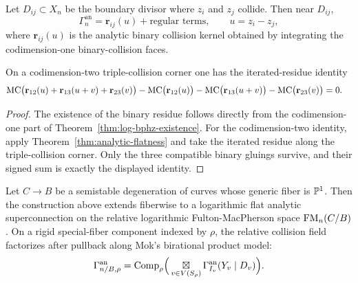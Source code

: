 \begin{theorem}\label{thm:analytic-yb}
Let $D_{ij}\subset X_n$ be the boundary divisor where $z_i$ and $z_j$ collide. Then near $D_{ij}$,
\[
 \Gamma_n^{\mathrm{an}} = \mathbf r_{ij}(u)+\text{regular terms},
 \qquad u=z_i-z_j,
\]
where $\mathbf r_{ij}(u)$ is the analytic binary collision kernel obtained by integrating the codimension-one binary-collision faces.

On a codimension-two triple-collision corner one has the iterated-residue identity
\begin{align*}
 &\mathrm{MC}\big(\mathbf r_{12}(u)+\mathbf r_{13}(u+v)+\mathbf r_{23}(v)\big)
 -\mathrm{MC}\big(\mathbf r_{12}(u)\big)
 -\mathrm{MC}\big(\mathbf r_{13}(u+v)\big)
 -\mathrm{MC}\big(\mathbf r_{23}(v)\big)
 =0.
\end{align*}
\end{theorem}

\begin{proof}
The existence of the binary residue follows directly from the codimension-one part of Theorem~\ref{thm:log-bphz-existence}. For the codimension-two identity, apply Theorem~\ref{thm:analytic-flatness} and take the iterated residue along the triple-collision corner. Only the three compatible binary gluings survive, and their signed sum is exactly the displayed identity.
\end{proof}

\begin{theorem}\label{thm:family-version}
Let $C\to B$ be a semistable degeneration of curves whose generic fiber is $\mathbb P^1$. Then the construction above extends fiberwise to a logarithmic flat analytic superconnection on the relative logarithmic Fulton-MacPherson space $\mathrm{FM}_n(C/B)$. On a rigid special-fiber component indexed by $\rho$, the relative collision field factorizes after pullback along Mok's birational product model:
\[
 \Gamma_{n/B,\rho}^{\mathrm{an}}
 =
 \mathrm{Comp}_\rho\Big(
 \mathop{\boxtimes}\displaylimits_{v\in V(S_\rho)} \Gamma_{I_v}^{\mathrm{an}}(Y_v\mid D_v)
 \Big).
\]
\end{theorem}

